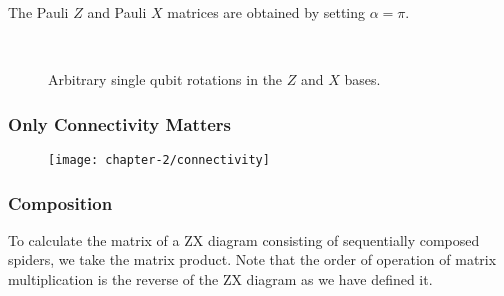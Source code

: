 The Pauli $Z$ and Pauli $X$ matrices are obtained by setting $\alpha = \pi$.
\begin{figure}[H]
\centering
{} \\[1ex]
\caption{Arbitrary single qubit rotations in the $Z$ and $X$ bases.}
\end{figure}


\subsubsection{Only Connectivity Matters}
\begin{figure}[H]
\centering
    \centering
    \texttt{[image: chapter-2/connectivity]}
    \caption{}
\end{figure}


\subsubsection{Composition}
To calculate the matrix of a ZX diagram consisting of sequentially composed spiders, we take the matrix product. Note that the order of operation of matrix multiplication is the reverse of the ZX diagram as we have defined it.

\begin{figure}[H]
    \centering
\end{figure}

